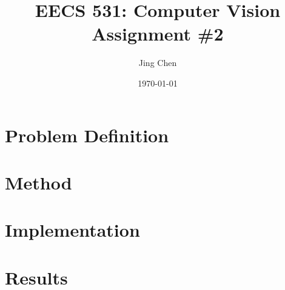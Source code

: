 \documentclass[paper=a4, 11pt]{article}
\title{	
EECS 531: Computer Vision\\
Assignment \#2
}
\author{Jing Chen} %
\date{\normalsize\today} %
\begin{document}
\maketitle %

\section{Problem Definition}

\section{Method}

\section{Implementation}

\section{Results}
\end{document}

